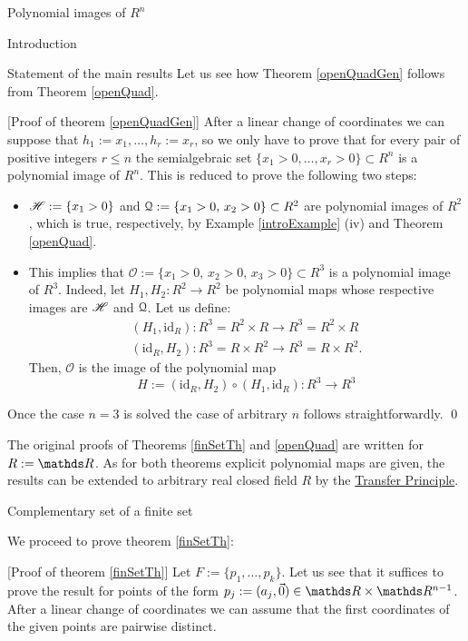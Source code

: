 \documentclass[11pt, a4paper, english, twoside, notitlepage, openright]{report}
\begin{document}
\begin{chapter}{Polynomial images of $R^n$}
\begin{section}{Introduction}
\begin{subsection}{Statement of the main results}
Let us see how Theorem \ref{openQuadGen} follows from Theorem \ref{openQuad}.
		
\vspace{1mm}		
		
[Proof of theorem \ref{openQuadGen}] After a linear change of coordinates we can suppose that $h_1:=x_1,\dots,h_r:=x_r$,  so we only have to prove that for every pair of positive integers $r\leq n$ the semialgebraic set $\{x_1>0,\dots,x_r>0\}\subset R^n$ is a polynomial image of $R^n$. This is reduced to prove the following two steps:
\begin{itemize}
\item $\mathscr{H}:=\{x_1>0\}$ and $\mathcal{Q}:=\{x_1>0,\, x_2>0\}\subset R^2$ are polynomial images of $R^2$, which is true, respectively, by Example \ref{introExample} (iv) and Theorem \ref{openQuad}.
\item This implies that $\mathscr{O}:=\{x_1>0,\, x_2>0,\, x_3>0\}\subset R^3$ is a polynomial image of $R^3$. Indeed, let $H_1,H_2:R^2 \rightarrow R^2$ be polynomial maps whose respective images are $\mathscr{H}$ and $\mathcal{Q}$. Let us define:
\begin{align*}
(H_1,\text{id}_R): R^3=R^2\times R\longrightarrow R^3= R^2\times R\\
(\text{id}_R,H_2): R^3=R\times R^2\longrightarrow R^3= R\times R^2.
\end{align*}
Then, $\mathscr{O}$ is the image of the polynomial map 
$$
H:=(\text{id}_R,H_2)\circ(H_1,\text{id}_R):R^3\rightarrow R^3
$$ 
\end{itemize} 
Once the case $n=3$ is solved the case of arbitrary $n$ follows straightforwardly.	\qed		

\vspace{1mm}
		
The original proofs of Theorems \ref{finSetTh} and \ref{openQuad} are written for $R:=\R$. As for both theorems explicit polynomial maps are given, the results can be extended to arbitrary real closed field $R$ by the \hyperref[TP]{Transfer Principle}.
\end{subsection}
\end{section}

\begin{section}{Complementary set of a finite set}
	
We proceed to prove theorem \ref{finSetTh}:
	
\vspace{1mm}
	
[Proof of theorem \ref{finSetTh}] Let $F:=\{p_1,\dots,p_k\}$. Let us see that it suffices to prove the result for points of the form $p_j:=(a_j,\vec{0})\in\R\times\R^{n-1}$. After a linear change of coordinates we can assume that the first coordinates of the given points are pairwise distinct. 


\end{section}
\end{chapter}
\end{document}
